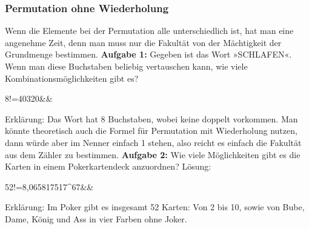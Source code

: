 \documentclass[12pt]{article}
\begin{document}
			\subsubsection{Permutation ohne Wiederholung}
				Wenn die Elemente bei der Permutation alle unterschiedlich ist, hat man eine angenehme Zeit, denn man muss nur die Fakultät von der Mächtigkeit der Grundmenge bestimmen.\newline\newline
				\textbf{Aufgabe 1:} Gegeben ist das Wort »SCHLAFEN«. Wenn man diese Buchstaben beliebig vertauschen kann, wie viele Kombinationsmöglichkeiten gibt es?
				\begin{flalign*}
				8!=40320&&
				\end{flalign*}
				Erklärung: Das Wort hat 8 Buchstaben, wobei keine doppelt vorkommen. Man könnte theoretisch auch die Formel für Permutation mit Wiederholung nutzen, dann würde aber im Nenner einfach 1 stehen, also reicht es einfach die Fakultät aus dem Zähler zu bestimmen.\newline\newline
				\textbf{Aufgabe 2:} Wie viele Möglichkeiten gibt es die Karten in einem Pokerkartendeck anzuordnen?\newline\newline
				Lösung:
				\begin{flalign*}
				52!=8,065817517^{67}&&
				\end{flalign*}
				Erklärung: Im Poker gibt es insgesamt 52 Karten: Von 2 bis 10, sowie von Bube, Dame, König und Ass in vier Farben ohne Joker.
\end{document}
